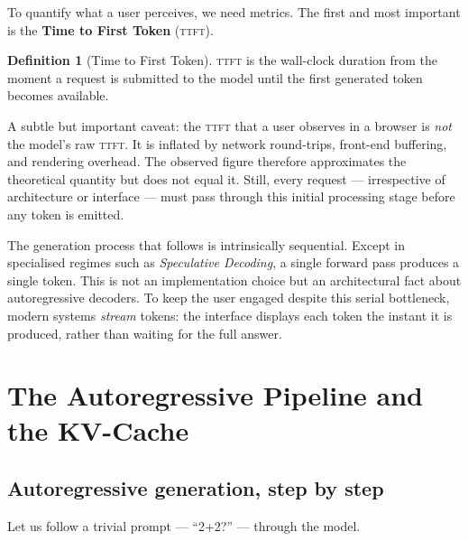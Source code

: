 \documentclass[11pt,a4paper]{article}
\theoremstyle{definition}
\newtheorem{definition}{Definition}[section]
\theoremstyle{plain}
\newcommand{\TTFT}{\textsc{ttft}}
\begin{document}
To quantify what a user perceives, we need metrics. The first and most important is the \textbf{Time to First Token} (\TTFT{}).

\begin{definition}[Time to First Token]
\TTFT{} is the wall-clock duration from the moment a request is submitted to the model until the first generated token becomes available.
\end{definition}

A subtle but important caveat: the \TTFT{} that a user observes in a browser is \emph{not} the model's raw \TTFT{}. It is inflated by network round-trips, front-end buffering, and rendering overhead. The observed figure therefore approximates the theoretical quantity but does not equal it. Still, every request --- irrespective of architecture or interface --- must pass through this initial processing stage before any token is emitted.

The generation process that follows is intrinsically sequential. Except in specialised regimes such as \emph{Speculative Decoding}, a single forward pass produces a single token. This is not an implementation choice but an architectural fact about autoregressive decoders. To keep the user engaged despite this serial bottleneck, modern systems \emph{stream} tokens: the interface displays each token the instant it is produced, rather than waiting for the full answer.

\section{The Autoregressive Pipeline and the KV-Cache}

\subsection{Autoregressive generation, step by step}

Let us follow a trivial prompt --- ``2+2?'' --- through the model.
\end{document}
